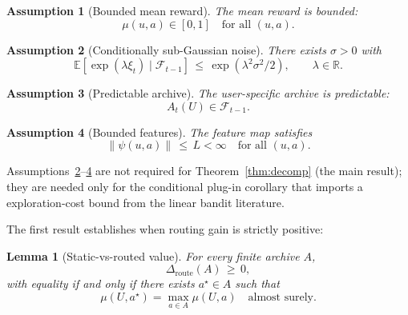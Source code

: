 \documentclass{article} %
\newtheorem{lemma}[theorem]{Lemma}
\newtheorem{assumption}{Assumption}
\providecommand{\E}{\mathbb{E}}
\begin{document}
\begin{assumption}[Bounded mean reward]
\label{ass:bounded}
The mean reward is bounded:
\begin{equation}
\label{eq:ass-bounded}
\mu(u,a) \in [0,1] \quad \text{for all } (u,a).
\end{equation}
\end{assumption}

\begin{assumption}[Conditionally sub-Gaussian noise]
\label{ass:subg}
There exists $\sigma > 0$ with
\begin{equation}
\label{eq:ass-subg}
\E\!\left[\exp(\lambda \xi_t) \mid \mathcal{F}_{t-1}\right] \,\le\, \exp(\lambda^2 \sigma^2 / 2), \qquad \lambda \in \mathbb{R}.
\end{equation}
\end{assumption}

\begin{assumption}[Predictable archive]
\label{ass:predictable}
The user-specific archive is predictable:
\begin{equation}
\label{eq:ass-pred}
A_t(U) \in \mathcal{F}_{t-1}.
\end{equation}
\end{assumption}

\begin{assumption}[Bounded features]
\label{ass:bounded-feat}
The feature map satisfies
\begin{equation}
\label{eq:ass-feat}
\|\psi(u,a)\| \,\le\, L < \infty \quad \text{for all } (u,a).
\end{equation}
\end{assumption}

Assumptions~\ref{ass:subg}--\ref{ass:bounded-feat} are not required for Theorem~\ref{thm:decomp} (the main result); they are needed only for the conditional plug-in corollary that imports a exploration-cost bound from the linear bandit literature.

\label{sec:method-lem-het}

The first result establishes when routing gain is strictly positive:

\begin{lemma}[Static-vs-routed value]
\label{lem:hetero}
For every finite archive $A$,
\begin{equation}
\label{eq:lem-hetero}
\Delta_{\mathrm{route}}(A) \,\ge\, 0,
\end{equation}
with equality if and only if there exists $a^\star \in A$ such that
\begin{equation}
\label{eq:lem-hetero-eq}
\mu(U, a^\star) = \max_{a \in A} \mu(U,a) \quad \text{almost surely.}
\end{equation}
\end{lemma}
\end{document}

